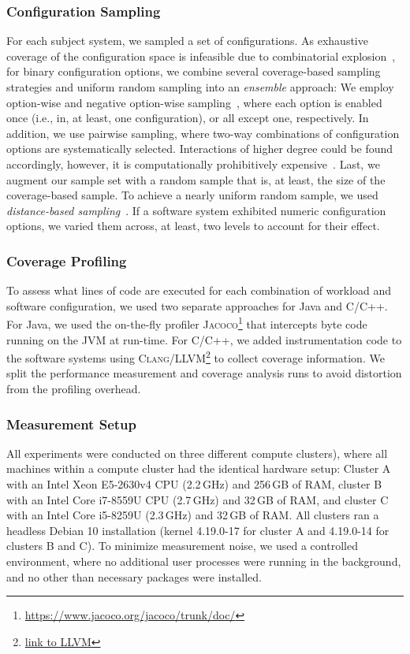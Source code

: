\subsubsection{Configuration Sampling}\label{sec:sampling}
For each subject system, we sampled a set of configurations. As exhaustive coverage of the configuration space is infeasible due to combinatorial explosion~\cite{henardCombining2015}, for binary configuration options, we combine several coverage-based sampling strategies and uniform random sampling into an \emph{ensemble} approach: 
We employ option-wise and negative option-wise sampling~\cite{siegmundPerformanceinfluenceModelsHighly2015}, where each option is enabled once (i.e., in, at least, one configuration), or all except one, respectively. In addition, we use pairwise sampling, where two-way combinations of configuration options are systematically selected. Interactions of higher degree could be found accordingly, however, it is computationally prohibitively expensive~\cite{henardCombining2015}. 
Last, we augment our sample set with a random sample that is, at least, the size of the coverage-based sample. To achieve a nearly uniform random sample, we used \emph{distance-based sampling}~\cite{kaltenecker_distance-based_2019}. If a software system exhibited numeric configuration options, we varied them across, at least, two levels to account for their effect. %


\subsubsection{Coverage Profiling}\label{sec:profiling}
{\color{edited}
To assess what lines of code are executed for each combination of workload and software configuration, we used two separate approaches for Java and C/C++. For Java, we used the on-the-fly profiler \textsc{Jacoco}\footnote{\url{https://www.jacoco.org/jacoco/trunk/doc/}} that intercepts byte code running on the JVM at run-time. For C/C++, we added instrumentation code to the software systems using \textsc{Clang/LLVM}\footnote{\url{link to LLVM}} to collect coverage information. We split the performance measurement and coverage analysis runs to  avoid distortion from the profiling overhead.
}
	
\subsubsection{Measurement Setup}\label{sec:measurement_setup}
All experiments were conducted on three different compute clusters), where all machines within a compute cluster had the identical hardware setup: Cluster \textsf{A} with an Intel Xeon E5-2630v4 CPU (2.2\,GHz) and 256\,GB of RAM, cluster \textsf{B}  with an Intel Core i7-8559U CPU (2.7\,GHz) and 32\,GB of RAM, and cluster \textsf{C} with an Intel Core i5-8259U (2.3\,GHz) and 32\,GB of RAM. All clusters ran a headless Debian 10 installation (kernel 4.19.0-17 for cluster \textsf{A} and 4.19.0-14 for clusters \textsf{B} and \textsf{C}). To minimize measurement noise, we used a controlled environment, where no additional user processes were running in the background, and no other than necessary packages were installed. 

